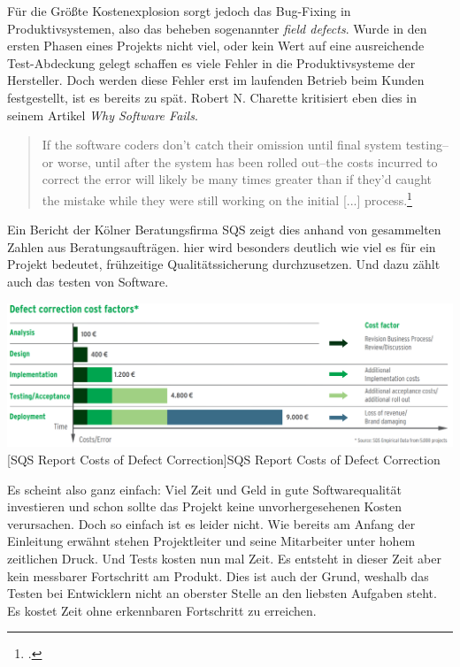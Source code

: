 \documentclass[12pt,a4paper,bibliography=totocnumbered,listof=totocnumbered]{scrartcl}
\begin{document}
Für die Größte Kostenexplosion sorgt jedoch das Bug-Fixing in Produktivsystemen, also das beheben sogenannter \textit{field defects}. Wurde in den ersten Phasen eines Projekts nicht viel, oder kein Wert auf eine ausreichende Test-Abdeckung gelegt schaffen es viele Fehler in die Produktivsysteme der Hersteller. Doch werden diese Fehler erst im laufenden Betrieb beim Kunden festgestellt, ist es bereits zu spät. Robert N. Charette kritisiert eben dies in seinem Artikel \textit{Why Software Fails}.

\begin{quote}
	\begin{itshape}
	If the software coders don't catch their omission until final system testing--or worse, until after the system has been rolled out--the costs incurred to correct the error will likely be many times greater than if they'd caught the mistake while they were still working on the initial [...] process.\footcite{charette}
	\end{itshape}
\end{quote}

Ein Bericht der Kölner Beratungsfirma SQS zeigt dies anhand von gesammelten Zahlen aus Beratungsaufträgen. hier wird besonders deutlich wie viel es für ein Projekt bedeutet, frühzeitige Qualitätssicherung durchzusetzen. Und dazu zählt auch das testen von Software.

\vspace{1em}
\begin{minipage}{\linewidth}
	\centering
	\includegraphics[width=0.9\linewidth]{images/img_sqs-defect-correction.PNG}
	[SQS Report Costs of Defect Correction]{SQS Report Costs of Defect Correction \footnotemark}
	\label{fig:img_sqs-defect-correction}
\end{minipage}

Es scheint also ganz einfach: Viel Zeit und Geld in gute Softwarequalität investieren und schon sollte das Projekt keine unvorhergesehenen Kosten verursachen. Doch so einfach ist es leider nicht.
Wie bereits am Anfang der Einleitung erwähnt stehen Projektleiter und seine Mitarbeiter unter hohem zeitlichen Druck. Und Tests kosten nun mal Zeit. Es entsteht in dieser Zeit aber kein messbarer Fortschritt am Produkt. Dies ist auch der Grund, weshalb das Testen bei Entwicklern nicht an oberster Stelle an den liebsten Aufgaben steht. Es kostet Zeit ohne erkennbaren Fortschritt zu erreichen.
\end{document}
